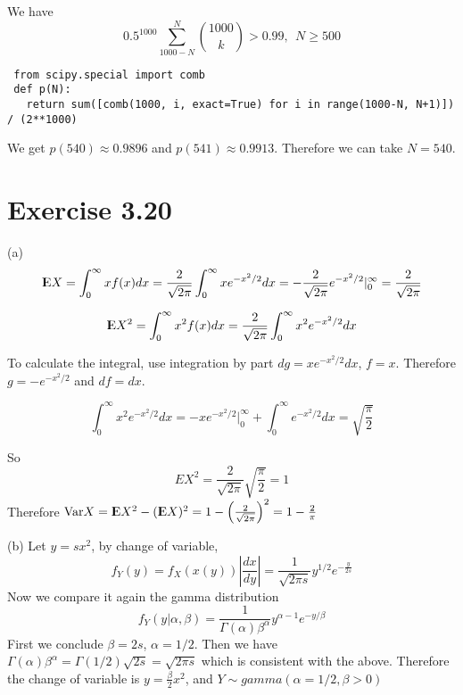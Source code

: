 \documentclass[12pt]{article}
\begin{document}
We have
$$ 0.5^{1000} \sum^{N}_{1000-N} {1000 \choose k} > 0.99, \ \ N \geq 500$$
\begin{lstlisting}
 from scipy.special import comb
 def p(N):
   return sum([comb(1000, i, exact=True) for i in range(1000-N, N+1)]) / (2**1000)
\end{lstlisting}
We get $p(540) \approx 0.9896$ and $p(541) \approx 0.9913$. Therefore we can take $N = 540$.

\section*{Exercise 3.20}
(a) $$ {\rm I\kern-.3em E} X = \int^{\infty}_{0} xf(x) dx = \frac{2}{\sqrt{2\pi}} \int^{\infty}_{0} x e^{-x^2/2} dx
 = - \frac{2}{\sqrt{2\pi}} e^{-x^2/2} |^{\infty}_{0} =  \frac{2}{\sqrt{2\pi}}$$
 
 $${\rm I\kern-.3em E} X^2 = \int^{\infty}_{0} x^2f(x) dx =  \frac{2}{\sqrt{2\pi}} \int^{\infty}_{0} x^2 e^{-x^2/2} dx$$
 
To calculate the integral, use integration by part $dg = x e^{-x^2/2}dx$, $f = x$. Therefore $g = -e^{-x^2/2}$ and $df=dx$. 

$$\int^{\infty}_{0} x^2 e^{-x^2/2} dx = -xe^{-x^2/2}|^{\infty}_{0} + \int^{\infty}_{0} e^{-x^2/2} dx = \sqrt{\frac{\pi}{2}}$$

So $$EX^2 = \frac{2}{\sqrt{2\pi}}  \sqrt{\frac{\pi}{2}} = 1$$
Therefore $\mathrm{Var} X = {\rm I\kern-.3em E} X^2 - ({\rm I\kern-.3em E} X)^2 = 1 - \left( \frac{2}{\sqrt{2\pi}}\right)^2 = 1 - \frac{2}{\pi}$ 

(b) Let $y=sx^2$, by change of variable,
$$ f_Y(y) = f_X(x(y)) \left| \frac{dx}{dy} \right| = \frac{1}{\sqrt{2\pi s}} y^{1/2} e^{-\frac{y}{2s}}$$
Now we compare it again the gamma distribution $$ f_Y(y|\alpha, \beta) = \frac{1}{\Gamma(\alpha)\beta^{\alpha}} y^{\alpha - 1} e^{-y/\beta}$$
First we conclude $\beta = 2s$, $\alpha = 1/2$. Then we have $\Gamma(\alpha)\beta^{\alpha} = \Gamma(1/2)\sqrt{2s} = \sqrt{2\pi s}$ which is consistent with the above. Therefore the change of variable is $y = \frac{\beta}{2} x^2$, and $Y \sim gamma(\alpha=1/2, \beta > 0)$
\end{document}
